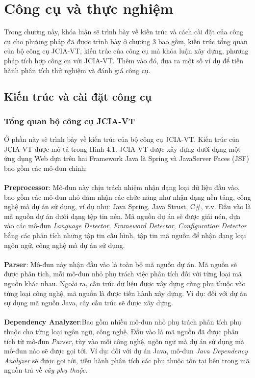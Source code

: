 \documentclass[12pt]{report}
\begin{document}
\chapter{Công cụ và thực nghiệm}
Trong chương này, khóa luận sẽ trình bày về kiến trúc và cách cài đặt của công cụ cho phương pháp đã được trình bày ở chương 3 bao gồm, kiến trúc tổng quan của bộ công cụ JCIA-VT, kiến trúc của công cụ mà khóa luận xây dựng, phương pháp tích hợp công cụ với JCIA-VT. Thêm vào đó, đưa ra một số ví dụ để tiến hành phân tích thử nghiệm và đánh giá công cụ.

\newpage
\section{Kiến trúc và cài đặt công cụ}
\subsection{Tổng quan bộ công cụ JCIA-VT}
Ở phần này sẽ trình bày về kiến trúc của bộ công cụ JCIA-VT. Kiến trúc của JCIA-VT được mô tả trong Hình 4.1. JCIA-VT được xây dựng dưới dạng một ứng dụng Web dựa trên hai Framework Java là Spring và JavaServer Faces (JSF) bao gồm các mô-đun chính:\\\\ 
\textbf{Preprocessor}: Mô-đun này chịu trách nhiệm nhận dạng loại dữ liệu đầu vào, bao gồm các mô-đun nhỏ đảm nhận các chức năng như nhận dạng nền tảng, công nghệ mà dự án sử dụng, ví dụ như: Java Spring, Java Strust, C$\#$, v.v. Đầu vào là mã nguồn dự án dưới dạng tệp tin nén. Mã nguồn dự án sẽ được giải nén, dựa vào các mô-đun \textit{Language Detector}, \textit{Frameword Detector}, \textit{Configuration Detector} bằng các phân tích những tập tin cấu hình, tập tin mã nguồn để nhận dạng loại ngôn ngữ, công nghệ mà dự án sử dụng.\\\\
\noindent \textbf{Parser}: Mô-đun này nhận đầu vào là toàn bộ mã nguồn dự án. Mã nguồn sẽ được phân tích, mỗi mô-đun nhỏ phụ trách việc phân tích đối với từng loại mã nguồn khác nhau. Ngoài ra, cấu trúc dữ liệu được xây dựng cũng phụ thuộc vào từng loại công nghệ, mã nguồn là được tiến hành xây dựng. Ví dụ: đối với dự án sự dụng mã nguồn Java, cây cấu trúc sẽ được xây dựng.\\\\
\noindent \textbf{Dependency Analyzer}:Bao gồm nhiều mô-đun nhỏ phụ trách phân tích phụ thuộc cho từng loại ngôn ngữ, công nghệ. Đầu vào là mã nguồn đã được phân tích từ mô-đun \textit{Parser}, tùy vào mỗi công nghệ, ngôn ngữ mà dự án sử dụng mà mô-đun nào sẽ được gọi tới. Ví dụ: đối với dự án Java, mô-đun \textit{Java Dependency Analyzer} sẽ được gọi tới, tiến hành phân tích các phụ thuộc tồn tại bên trong mã nguồn trả về \textit{cây phụ thuộc}.\\\\
\end{document}
